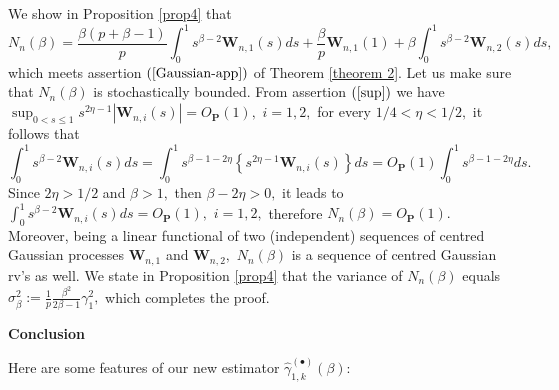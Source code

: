\documentclass[reqno,openbib,runningheads,a4paper,12pt]{amsart}%
\begin{document}
We show in Proposition \ref{prop4} that
\[
N_{n}\left(  \beta\right)  =\frac{\beta\left(  p+\beta-1\right)  }{p}\int%
_{0}^{1}s^{\beta-2}\mathbf{W}_{n,1}\left(  s\right)  ds+\frac{\beta}%
{p}\mathbf{W}_{n,1}\left(  1\right)  +\beta\int_{0}^{1}s^{\beta-2}%
\mathbf{W}_{n,2}\left(  s\right)  ds,
\]
which meets assertion $\left(  \ref{Gaussian-app}\right)  $ of Theorem
\ref{theorem 2}. Let us make sure that $N_{n}\left(  \beta\right)  $ is
stochastically bounded. From assertion $\left(  \ref{sup}\right)  $ we have
$\sup_{0<s\leq1}s^{2\eta-1}\left\vert \mathbf{W}_{n,i}\left(  s\right)
\right\vert =O_{\mathbf{P}}\left(  1\right)  ,$ $i=1,2,$ for every
$1/4<\eta<1/2,$ it follows that
\[
\int_{0}^{1}s^{\beta-2}\mathbf{W}_{n,i}\left(  s\right)  ds=\int_{0}%
^{1}s^{\beta-1-2\eta}\left\{  s^{2\eta-1}\mathbf{W}_{n,i}\left(  s\right)
\right\}  ds=O_{\mathbf{P}}\left(  1\right)  \int_{0}^{1}s^{\beta-1-2\eta}ds.
\]
Since $2\eta>1/2$ and $\beta>1,$ then $\beta-2\eta>0,$ it leads to $\int%
_{0}^{1}s^{\beta-2}\mathbf{W}_{n,i}\left(  s\right)  ds=O_{\mathbf{P}}\left(
1\right)  ,$ $i=1,2,$ therefore $N_{n}\left(  \beta\right)  =O_{\mathbf{P}%
}\left(  1\right)  .$ Moreover, being a linear functional of two (independent)
sequences of centred Gaussian processes $\mathbf{W}_{n,1}$ and $\mathbf{W}%
_{n,2},$ $N_{n}\left(  \beta\right)  $ is a sequence of centred Gaussian rv's
as well. We state in Proposition \ref{prop4} that the variance of
$N_{n}\left(  \beta\right)  $ equals $\sigma_{\beta}^{2}:=\frac{1}{p}%
\frac{\beta^{2}}{2\beta-1}\gamma_{1}^{2},$ which completes the
proof.\textbf{\newpage}

\noindent\textbf{Conclusion\smallskip}

\noindent Here are some features of our new estimator $\widehat{\gamma}%
_{1,k}^{\left(  \bullet\right)  }\left(  \beta\right)  :$
\end{document}
